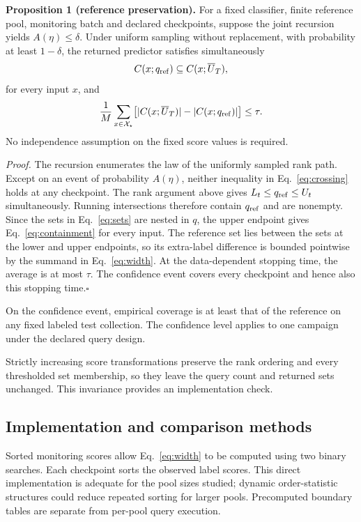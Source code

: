 \documentclass[preprint,12pt]{elsarticle}
\begin{document}
\textbf{Proposition 1 (reference preservation).}
For a fixed classifier, finite reference pool, monitoring batch and declared checkpoints, suppose the joint recursion yields $A(\eta)\le\delta$. Under uniform sampling without replacement, with probability at least $1-\delta$, the returned predictor satisfies simultaneously
\begin{equation}
 C(x;q_{\rm ref})\subseteq C(x;\overline U_T),
 \label{eq:containment}
\end{equation}
for every input $x$, and
\begin{equation}
 \frac1M\sum_{x\in\mathcal X_\star}
 \bigl[|C(x;\overline U_T)|-|C(x;q_{\rm ref})|\bigr]
 \le\tau.
 \label{eq:inflation}
\end{equation}
No independence assumption on the fixed score values is required.

\textit{Proof.} The recursion enumerates the law of the uniformly sampled rank path. Except on an event of probability $A(\eta)$, neither inequality in Eq.~\eqref{eq:crossing} holds at any checkpoint. The rank argument above gives $L_t\le q_{\rm ref}\le U_t$ simultaneously. Running intersections therefore contain $q_{\rm ref}$ and are nonempty. Since the sets in Eq.~\eqref{eq:sets} are nested in $q$, the upper endpoint gives Eq.~\eqref{eq:containment} for every input. The reference set lies between the sets at the lower and upper endpoints, so its extra-label difference is bounded pointwise by the summand in Eq.~\eqref{eq:width}. At the data-dependent stopping time, the average is at most $\tau$. The confidence event covers every checkpoint and hence also this stopping time.\hfill$\square$

On the confidence event, empirical coverage is at least that of the reference on any fixed labeled test collection. The confidence level applies to one campaign under the declared query design.

Strictly increasing score transformations preserve the rank ordering and every thresholded set membership, so they leave the query count and returned sets unchanged. This invariance provides an implementation check.

\subsection{Implementation and comparison methods}
Sorted monitoring scores allow Eq.~\eqref{eq:width} to be computed using two binary searches. Each checkpoint sorts the observed label scores. This direct implementation is adequate for the pool sizes studied; dynamic order-statistic structures could reduce repeated sorting for larger pools. Precomputed boundary tables are separate from per-pool query execution.
\end{document}
